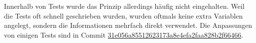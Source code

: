 Innerhalb von Tests wurde das Prinzip allerdings häufig nicht eingehalten. Weil die Tests oft schnell geschrieben wurden, wurden oftmals keine extra Variablen angelegt, sondern die Informationen mehrfach direkt verwendet. Die Anpassungen von einigen Tests sind in Commit \href{https://github.com/EinToni/Wortfinder/commit/31e056a85512623173a8e4efa2faa828b2f66466}{31e056a85512623173a8e4efa2faa828b2f66466}.
\endinput